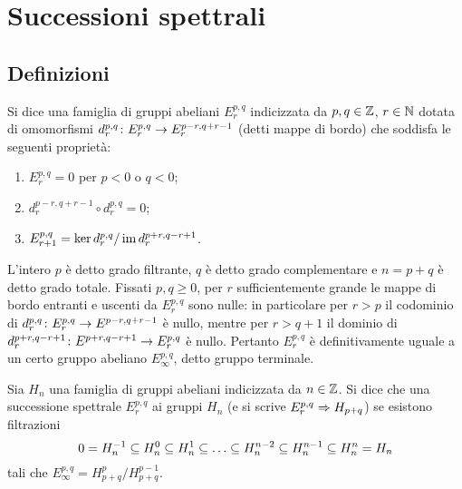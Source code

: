 \chapter{Successioni spettrali}
\label{ch:spectral-sequences}
\section{Definizioni}
\begin{definition}
Si dice  una famiglia di gruppi abeliani $E^{p,q}_r$ indicizzata da $p,q\in\mathbb{Z}$, $r\in\mathbb{N}$ dotata di omomorfismi $\map{d^{p,q}_r}{E^{p,q}_r}{E^{p-r,q+r-1}_r}$ (detti mappe di bordo) che soddisfa le seguenti proprietà:
\begin{enumerate}
\item $E^{p,q}_r=0$ per $p<0$ o $q<0$;
\item $d^{p-r,q+r-1}_r\circ d^{p,q}_r=0$;
\item $E^{p,q}_{r+1}=\ker d^{p,q}_r/\operatorname{im} d^{p+r,q-r+1}_r$.
\end{enumerate}
\end{definition}
L'intero $p$ è detto grado filtrante, $q$ è detto grado complementare e $n=p+q$ è detto grado totale. Fissati $p,q\ge 0$, per $r$ sufficientemente grande le mappe di bordo entranti e uscenti da $E^{p,q}_r$ sono nulle: in particolare per $r>p$ il codominio di $\map{d^{p,q}_r}{E^{p,q}_r}{E^{p-r,q+r-1}}$ è nullo, mentre per $r>q+1$ il dominio di $\map{d^{p+r,q-r+1}_r}{E^{p+r,q-r+1}}{E^{p,q}_r}$ è nullo. Pertanto $E^{p,q}_r$ è definitivamente uguale a un certo gruppo abeliano $E^{p,q}_\infty$, detto gruppo terminale.
\begin{definition}
Sia $H_n$ una famiglia di gruppi abeliani indicizzata da $n\in\mathbb{Z}$. Si dice che una successione spettrale $E^{p,q}_r$  ai gruppi $H_n$ (e si scrive $E^{p,q}_r\Rightarrow H_{p+q}$) se esistono filtrazioni
$$
0=H^{-1}_n\subseteq H^0_n\subseteq H^1_n\subseteq\ldots\subseteq H^{n-2}_n\subseteq H^{n-1}_n\subseteq H^n_n=H_n
$$
tali che $E^{p,q}_\infty=H^p_{p+q}/H^{p-1}_{p+q}$.
\end{definition}

